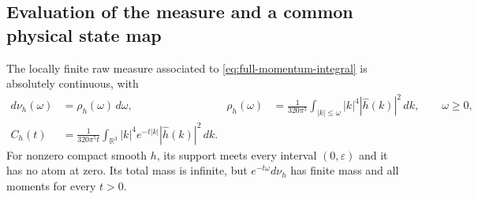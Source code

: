 \subsection{Evaluation of the measure and a common physical state map}

\begin{theorem}\label{thm:full-density}
The locally finite raw measure associated to
\eqref{eq:full-momentum-integral} is absolutely continuous, with
\begin{align}
 d\nu_h(\omega)&=\rho_h(\omega)\,d\omega,&
 \rho_h(\omega)&=\frac{1}{320\pi^5}
       \int_{|k|\le\omega}|k|^4|\widehat h(k)|^2\,dk,
       \qquad \omega\ge0,\label{eq:full-density}\\
 C_h(t)&=\frac{1}{320\pi^5t}
       \int_{\mathbb R^3}|k|^4 e^{-t|k|}|\widehat h(k)|^2\,dk .
       \label{eq:full-laplace}
\end{align}
For nonzero compact smooth $h$, its support meets every interval
$(0,\varepsilon)$ and it has no atom at zero. Its total mass is
infinite, but $e^{-t\omega}d\nu_h$ has finite mass and all moments
for every $t>0$.
\end{theorem}
